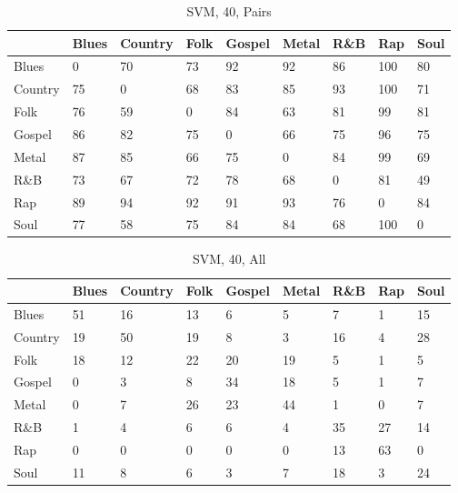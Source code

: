 \documentclass[a4paper,oneside]{article}
\begin{document}
\begin{table}[H]\centering
\caption{SVM, 40, Pairs}
\begin{tabu}{l|*{8}{l}}
 & Blues & Country & Folk & Gospel & Metal & R\&B & Rap & Soul \\ \hline
Blues & 0 & 70 & 73 & 92 & 92 & 86 & 100 & 80 \\
Country & 75 & 0 & 68 & 83 & 85 & 93 & 100 & 71 \\
Folk & 76 & 59 & 0 & 84 & 63 & 81 & 99 & 81 \\
Gospel & 86 & 82 & 75 & 0 & 66 & 75 & 96 & 75 \\
Metal & 87 & 85 & 66 & 75 & 0 & 84 & 99 & 69 \\
R\&B & 73 & 67 & 72 & 78 & 68 & 0 & 81 & 49 \\
Rap & 89 & 94 & 92 & 91 & 93 & 76 & 0 & 84 \\
Soul & 77 & 58 & 75 & 84 & 84 & 68 & 100 & 0
\end{tabu}
\end{table}

\begin{table}[H]\centering
\caption{SVM, 40, All}
\begin{tabu}{l|*{8}{l}}
 & Blues & Country & Folk & Gospel & Metal & R\&B & Rap & Soul \\ \hline
Blues & 51 & 16 & 13 & 6 & 5 & 7 & 1 & 15 \\
Country & 19 & 50 & 19 & 8 & 3 & 16 & 4 & 28 \\
Folk & 18 & 12 & 22 & 20 & 19 & 5 & 1 & 5 \\
Gospel & 0 & 3 & 8 & 34 & 18 & 5 & 1 & 7 \\
Metal & 0 & 7 & 26 & 23 & 44 & 1 & 0 & 7 \\
R\&B & 1 & 4 & 6 & 6 & 4 & 35 & 27 & 14 \\
Rap & 0 & 0 & 0 & 0 & 0 & 13 & 63 & 0 \\
Soul & 11 & 8 & 6 & 3 & 7 & 18 & 3 & 24 \\
\end{tabu}
\end{table}
\end{document}
